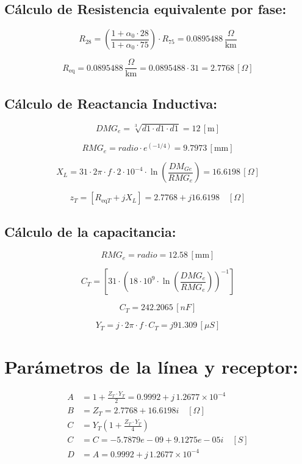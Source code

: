 \vspace{0.5cm}

\subsection*{Cálculo de Resistencia equivalente por fase:}

\[
R_{28} = \left( \frac{1 + \alpha_0 \cdot28}{1 + \alpha_0 \cdot 75} \right) \cdot R_{75} = 0.0895488 \, \frac{\Omega}{\text{km}}
\]

\[
R_{\text{eq}} = 0.0895488 \, \frac{\Omega}{\text{km}} = 0.0895488 \cdot 31 = 2.7768 \, [\Omega]
\]

\vspace{0.5cm}
\subsection*{Cálculo de Reactancia Inductiva:}


\[
DMG_{e} = \sqrt[3]{d1 \cdot d1 \cdot d1} = 12 \, [\text{m}]
\]

\vspace{0.3cm}
\[
RMG_{e} = radio\cdot e^{(-1/4)} = 9.7973 \, [\text{mm}]
\]

\vspace{0.3cm}
\[
X_L = 31\cdot 2\pi \cdot f \cdot2\cdot 10^{-4} \cdot \ln\left( \frac{DM_{Ge}}{RMG_e} \right) = 16.6198\, [\Omega]
\]

\[
z_T = \left[ R_{\text{eq}T} + jX_L \right] = 2.7768 + j16.6198 \quad [\Omega]
\]

\subsection*{Cálculo de la capacitancia:}

\[
RMG_{e} = radio = 12.58 \, [\text{mm}]
\]

\[
C_T = \left[ 31 \cdot \left(18 \cdot 10^9 \cdot \ln\left( \frac{DMG_e}{RMG_e} \right) \right)^{-1} \right]
\]

\[
C_T =  242.2065 \, [nF]
\]


\[
Y_T = j\cdot2\pi \cdot f \cdot C_T = j91.309 \, [\mu S]
\]

\section*{Parámetros de la línea y receptor:}

\begin{align*}
A &= 1 + \frac{Z_T \cdot Y_T}{2} = 0.9992 + j\,1.2677 \times 10^{-4} \\
B &= Z_T = 2.7768 +16.6198i \quad [\Omega] \\
C &= Y_T \left(1 + \frac{Z_T \cdot Y_T}{4} \right) \\
C &= C = -5.7879e-09 + 9.1275e-05i \quad [S] \\
D &= A =  0.9992 + j\,1.2677 \times 10^{-4} 
\end{align*}


